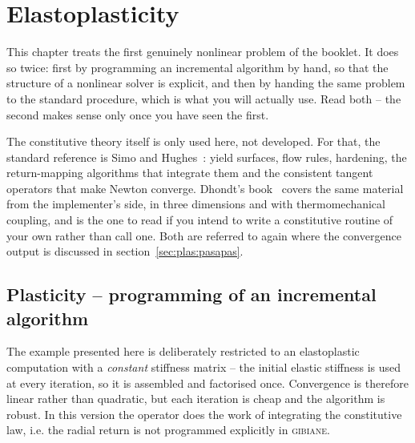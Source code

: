 \chapter{Elastoplasticity}
\label{chap:plasticity}



This chapter treats the first genuinely nonlinear problem of the booklet.
It does so twice: first by programming an incremental algorithm by hand, so
that the structure of a nonlinear solver is explicit, and then by handing the
same problem to the standard  procedure, which is what you will
actually use. Read both -- the second makes sense only once you have seen the
first.

The constitutive theory itself is only used here, not developed. For that,
the standard reference is Simo and Hughes~\cite{Simo:1998}: yield surfaces,
flow rules, hardening, the return-mapping algorithms that integrate them and
the consistent tangent operators that make Newton converge. Dhondt's
book~\cite{Dhondt:2004} covers the same material from the implementer's
side, in three dimensions and with thermomechanical coupling, and is the one
to read if you intend to write a constitutive routine of your own rather than
call one. Both are referred to again where the convergence output is
discussed in section~\ref{sec:plas:pasapas}.

\section{Plasticity -- programming of an incremental algorithm}
\label{sec:plas:incremental}

The example presented here is deliberately restricted to an elastoplastic
computation with a \emph{constant} stiffness matrix -- the initial elastic
stiffness is used at every iteration, so it is assembled and factorised once.
Convergence is therefore linear rather than quadratic, but each iteration is
cheap and the algorithm is robust. In this version the operator
  does
the work of integrating the constitutive law, i.e. the radial return is not
programmed explicitly in \textsc{gibiane}.

